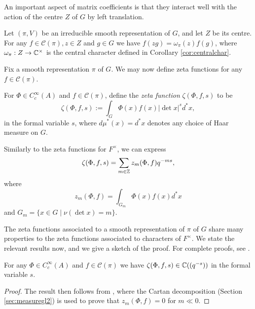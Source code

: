 An important aspect of matrix coefficients is that they interact well with the action of the centre $Z$ of $G$ by left translation. 

\begin{lemma}\label{central char}
    Let $(\pi,V)$ be an irreducible smooth representation of $G$, and let $Z$ be its centre. For any $f \in \mathcal C(\pi), z \in Z$ and $g \in G$ we have $f(zg) = \omega_\pi(z) f(g)$, where $\omega_\pi:Z\to\mathbb{C}^\times$ is the central character defined in Corollary \ref{cor:centralchar}.
\end{lemma}


Fix a smooth representation $\pi$ of $G$. We may now define zeta functions for any $f \in \mathcal C(\pi)$.

\begin{defn}
    For $\Phi \in C_c^\infty(A)$ and $f \in \mathcal C(\pi)$, define the \textit{zeta function} $\zeta(\Phi,f,s)$ to be
    $$\zeta(\Phi,f,s) := \int_{G} \Phi(x)f(x)|\det x|^s d^*x,$$ in the formal variable $s$, where $d\mu^*(x) = d^*x$ denotes any choice of Haar measure on $G$.
\end{defn}

Similarly to the zeta functions for $F^\times$, we can express 
$$\zeta(\Phi,f,s)=\sum_{m\in\mathbb{Z}}z_m(\Phi,f)q^{-ms},$$
where 
$$z_m(\Phi,f)=\int_{G_m}\Phi(x)f(x)d^*x$$
and $G_m=\{x\in G\mid\nu(\det x)=m\}$. 

The zeta functions associated to a smooth representation of $\pi$ of $G$ share many properties to the zeta functions associated to characters of $F^\times$. We state the relevant results now, and we give a sketch of the proof. For complete proofs, see \cite[\S 24.4]{BH1}.

\begin{lemma}
    For any $\Phi \in C_c^\infty(A)$ and $f \in \mathcal C(\pi)$ we have $\zeta(\Phi,f,s) \in \mathbb{C}((q^{-s}))$ in the formal variable $s$.
\end{lemma}
\begin{proof}
    The result then follows from \cite[Lemma 24.4.1]{BH1}, where the Cartan decomposition (Section \ref{sec:measuregl2}) is used to prove that $z_m(\Phi,f)=0$ for $m\ll0$.
\end{proof}

